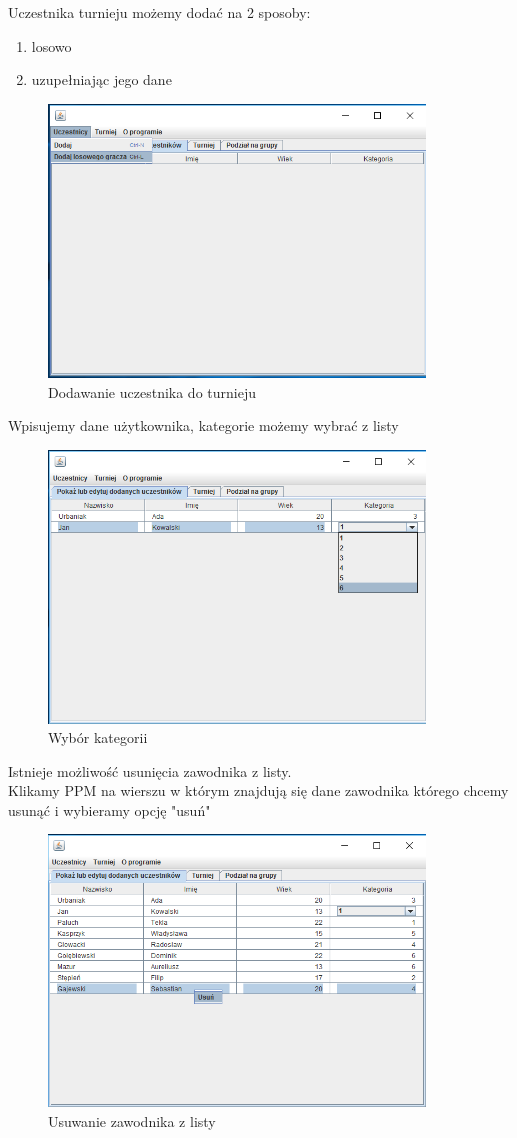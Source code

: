 Uczestnika turnieju możemy dodać na 2 sposoby:
\begin{enumerate}
	\item losowo
	\item uzupełniając jego dane
\end{enumerate}
\begin{figure}[H]
	\centering
	\includegraphics[width=10cm]{fig/4}
	\caption{Dodawanie uczestnika do turnieju}
	\label {fig:dodawanie_uczestnika_do_turnieju} 
\end{figure}
Wpisujemy dane użytkownika, kategorie możemy wybrać z listy
\begin{figure}[H]
	\centering
	\includegraphics[width=10cm]{fig/5}
	\caption{Wybór kategorii}
	\label {fig:wybor_kategorii} 
\end{figure}
Istnieje możliwość usunięcia zawodnika z listy.\\
Klikamy PPM na wierszu w którym znajdują się dane zawodnika którego chcemy usunąć i wybieramy opcję "usuń" 
\begin{figure}[H]
	\centering
	\includegraphics[width=10cm]{fig/6}
	\caption{Usuwanie zawodnika z listy}
	\label {fig:Usuwanie_zawodnika_z_listy} 
\end{figure}
